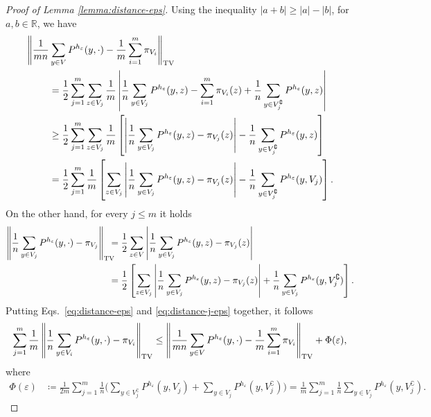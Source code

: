 \documentclass[11pt,oneside]{amsart}
\numberwithin{equation}{section}  %
\theoremstyle{plain}
\newcommand{\R}{\mathbb{R}}
\newcommand{\eps}{\varepsilon}
\newcommand{\tv}[1]{\left\|#1\right\|_{\rm TV}}
\newcommand{\h}{{h_\eps}}
\begin{document}
\begin{proof}[Proof of Lemma \ref{lemma:distance-eps}]
%	
		Using the inequality $|a+b|\ge |a|-|b|$, for $a,b \in \R$, we have
	\begin{equation}  \label{eq:distance-eps}
		\begin{split}
			\Bigg\| \frac{1}{mn}&\sum_{y \in V}P^{\h}(y,\cdot)-\frac{1}{m}\sum_{i=1}^m\pi_{V_i} \Bigg\|_{\rm TV}\\
			&= \frac12\sum_{j=1}^m\sum_{z \in V_j}\frac1m \left|\frac{1}{n}\sum_{y \in V_j}P^{\h}(y,z)-\sum_{i=1}^m{\pi_{V_i}(z)}+\frac{1}{n}\sum_{y \in V_j^\complement}P^{\h}(y,z)\right|\\
			& \ge  \frac12\sum_{j=1}^m\sum_{z \in V_j}\frac1m \left[\left|\frac{1}{n}\sum_{y \in V_j}P^{\h}(y,z)-\pi_{V_j}(z)\right| -\frac{1}{n}\sum_{y \in V_j^\complement}P^{\h}(y,z)\right]\\
			&= \frac12\sum_{j=1}^m\frac1m \left[\sum_{z \in V_j}\left|\frac{1}{n}\sum_{y \in V_j}P^{\h}(y,z)-{\pi_{V_j}(z)}\right| -\frac{1}{n}\sum_{y \in V_j^\complement}P^{\h}(y,V_j)\right].
		\end{split}
	\end{equation}
%
	On the other hand, for every $j \le m$ it holds
	\begin{equation} \label{eq:distance-j-eps}
		\begin{split}
			\tv { \frac1n \sum_{y \in V_j} P^{\h}(y,\cdot )-{\pi}_{V_j} }\!\!\!\!
			&=\frac12\sum_{z \in V} \left| \frac1n \sum_{y \in V_j}P^{\h}(y,z)-{\pi}_{V_j}(z)  \right|\\
		&=\frac12 \left[\sum_{z \in V_j} \left| \frac1n\sum_{y \in V_j}P^{\h}(y,z)-{\pi}_{V_j}(z)  \right|+ \frac1n \sum_{y \in V_j} P^{\h}(y, V_j^\complement )\right].
		\end{split}
	\end{equation}
	Putting Eqs.~\eqref{eq:distance-eps} and \eqref{eq:distance-j-eps} together, it follows
		\begin{equation} \label{eq:bound-eps}
		\begin{split}
			\sum_{j=1}^m\frac1m \tv {  \frac1n\sum_{y \in V_i} P^{\h}(y,\cdot )-{\pi}_{V_i} } \le \tv { \frac{1}{mn}\sum_{y \in V}P^{\h}(y,\cdot)-\frac{1}{m}\sum_{i=1}^m\pi_{V_i} }  + \Phi(\eps),
		\end{split}
	\end{equation}
	where
	\begin{equation}
		\begin{split}
			\Phi(\eps) &\coloneqq	\frac1{2m} \sum_{j=1}^m \frac{1}{n}\Big(\sum_{y \in V_j^\complement}P^{\h}(y,V_j)+\sum_{y \in V_j}P^{\h}(y,V_j^\complement)\Big)
			 = 	\frac1{m} \sum_{j=1}^m \frac{1}{n}\sum_{y \in V_j}P^{\h}(y,V_j^\complement).
		\end{split}
	\end{equation}
	

\end{proof}
\end{document}
